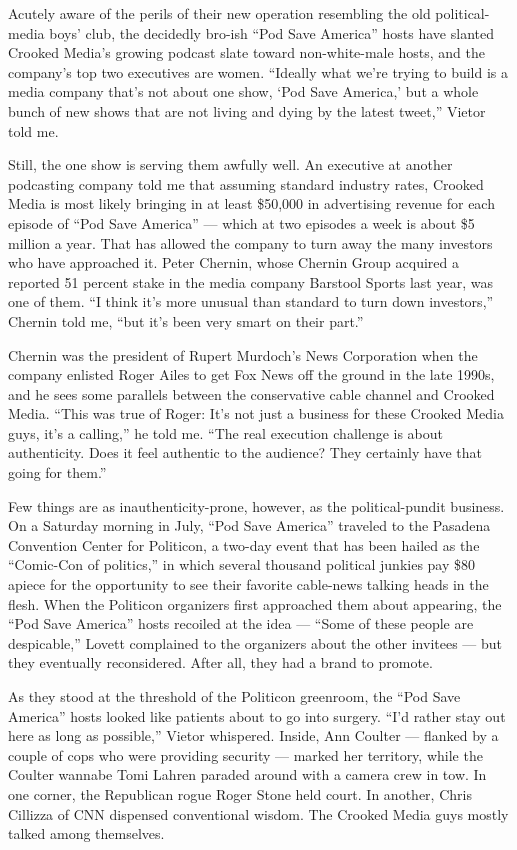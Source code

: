 Acutely aware of the perils of their new operation resembling the old
political-media boys' club, the decidedly bro-ish ``Pod Save America''
hosts have slanted Crooked Media's growing podcast slate toward
non-white-male hosts, and the company's top two executives are women.
``Ideally what we're trying to build is a media company that's not about
one show, `Pod Save America,' but a whole bunch of new shows that are
not living and dying by the latest tweet,'' Vietor told me.

Still, the one show is serving them awfully well. An executive at
another podcasting company told me that assuming standard industry
rates, Crooked Media is most likely bringing in at least \$50,000 in
advertising revenue for each episode of ``Pod Save America'' --- which
at two episodes a week is about \$5 million a year. That has allowed the
company to turn away the many investors who have approached it. Peter
Chernin, whose Chernin Group acquired a reported 51 percent stake in the
media company Barstool Sports last year, was one of them. ``I think it's
more unusual than standard to turn down investors,'' Chernin told me,
``but it's been very smart on their part.''

Chernin was the president of Rupert Murdoch's News Corporation when the
company enlisted Roger Ailes to get Fox News off the ground in the late
1990s, and he sees some parallels between the conservative cable channel
and Crooked Media. ``This was true of Roger: It's not just a business
for these Crooked Media guys, it's a calling,'' he told me. ``The real
execution challenge is about authenticity. Does it feel authentic to the
audience? They certainly have that going for them.''

Few things are as inauthenticity-prone, however, as the political-pundit
business. On a Saturday morning in July, ``Pod Save America'' traveled
to the Pasadena Convention Center for Politicon, a two-day event that
has been hailed as the ``Comic-Con of politics,'' in which several
thousand political junkies pay \$80 apiece for the opportunity to see
their favorite cable-news talking heads in the flesh. When the Politicon
organizers first approached them about appearing, the ``Pod Save
America'' hosts recoiled at the idea --- ``Some of these people are
despicable,'' Lovett complained to the organizers about the other
invitees --- but they eventually reconsidered. After all, they had a
brand to promote.

As they stood at the threshold of the Politicon greenroom, the ``Pod
Save America'' hosts looked like patients about to go into surgery.
``I'd rather stay out here as long as possible,'' Vietor whispered.
Inside, Ann Coulter --- flanked by a couple of cops who were providing
security --- marked her territory, while the Coulter wannabe Tomi Lahren
paraded around with a camera crew in tow. In one corner, the Republican
rogue Roger Stone held court. In another, Chris Cillizza of CNN
dispensed conventional wisdom. The Crooked Media guys mostly talked
among themselves.

